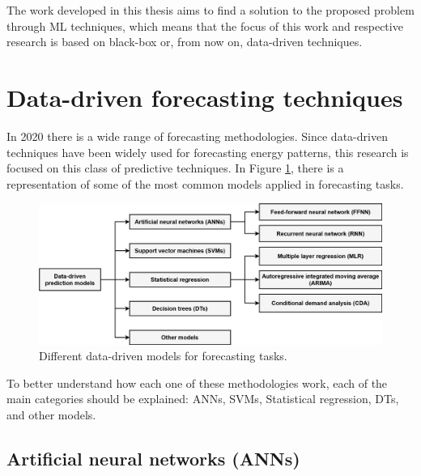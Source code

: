 The work developed in this thesis aims to find a solution to the proposed problem through \ac{ML} techniques, which means that the focus of this work and respective research is based on black-box or, from now on, data-driven techniques.

\section{Data-driven forecasting techniques\label{b}}

In 2020 there is a wide range of forecasting methodologies. Since data-driven techniques have been widely used for forecasting energy patterns, this research is focused on this class of predictive techniques. In Figure \ref{datamodels}, there is a representation of some of the most common models applied in forecasting tasks.

\begin{figure}[h!]
    \centering
    \begin{center}
    \includegraphics[width=1\textwidth]{Images/data-drive prediction models.png}
    \caption{Different data-driven models for forecasting tasks.}
    \label{datamodels}
    \end{center}
\end{figure}

To better understand how each one of these methodologies work, each of the main categories should be explained: \acf{ANNs}, \acf{SVMs}, Statistical regression, \acf{DTs}, and other models.


\subsection{Artificial neural networks (ANNs)}

